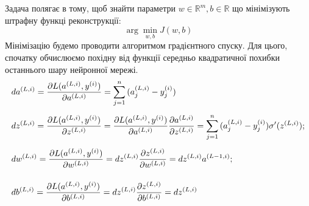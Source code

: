 \documentclass[14pt,a4paper]{extarticle}
\newcounter{e}
\numberwithin{equation}{section}
\numberwithin{figure}{section}
\newcommand{\ith}{^{(i)}}
\begin{document}
	Задача полягає в тому, щоб знайти параметри $w \in \mathbb{R}^{m}, b\in \mathbb{R}$ що мінімізують штрафну функці реконструкції:
	\begin{equation}
		\arg \min_{w, b} J (w, b)
	\end{equation}
	Мінімізацію будемо проводити алгоритмом градієнтного спуску. Для цього, спочатку обчислюємо похідну від функції середньо квадратичної похибки останнього шару нейронної мережі.
	\begin{equation}
		\begin{array}{l}
			\displaystyle
			da^{(L, i)}
			=
			\pdv{L(a^{(L, i)}, y\ith)}{a^{(L, i)}}
			=
			\sum_{j=1}^{n}{(a^{(L, i)}_j - y\ith_j)}
			\\[0.7cm]

			\displaystyle
			dz^{(L, i)}
			=
			\pdv{L(a^{(L, i)}, y\ith)}{z^{(L, i)}}
			= 
			\pdv{L(a^{(L, i)}, y\ith)}{a^{(L, i)}} \pdv{a^{(L, i)}}{z^{(L, i)}}
			=
			\sum_{j=1}^{n}{(a^{(L, i)}_j - y\ith_j)} \sigma^{\prime}(z^{(L, i)});
			\\[0.7cm]

			\displaystyle
			dw^{(L, i)} 
			=
			\pdv{L(a^{(L, i)}, y\ith)}{w^{(L, i)}}
			=
			dz^{(L, i)} \pdv{z^{(L, i)}}{w^{(L, i)}}
			=
			dz^{(L, i)} a^{(L-1, i)};
			\\[0.7cm]
	
			\displaystyle
			db^{(L, i)}
			=
			\pdv{L(a^{(L, i)}, y\ith)}{b^{(L, i)}}
			=
			dz^{(L, i)} \pdv{z^{(L, i)}}{b^{(L, i)}} 
			= 
			dz^{(L, i)}
			\\[0.7cm]
		\end{array}
	\end{equation}

\end{document}
